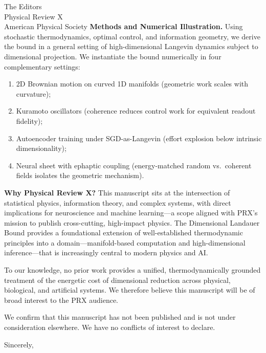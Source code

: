 \documentclass[11pt]{letter}
\begin{document}
\begin{letter}{The Editors\\Physical Review X\\American Physical Society}
\textbf{Methods and Numerical Illustration.} Using stochastic thermodynamics, optimal control, and information geometry, we derive the bound in a general setting of high-dimensional Langevin dynamics subject to dimensional projection. We instantiate the bound numerically in four complementary settings:
\begin{enumerate}
\item 2D Brownian motion on curved 1D manifolds (geometric work scales with curvature);
\item Kuramoto oscillators (coherence reduces control work for equivalent readout fidelity);
\item Autoencoder training under SGD-as-Langevin (effort explosion below intrinsic dimensionality);
\item Neural sheet with ephaptic coupling (energy-matched random vs.\ coherent fields isolates the geometric mechanism).
\end{enumerate}

\textbf{Why Physical Review X?} This manuscript sits at the intersection of statistical physics, information theory, and complex systems, with direct implications for neuroscience and machine learning---a scope aligned with PRX's mission to publish cross-cutting, high-impact physics. The Dimensional Landauer Bound provides a foundational extension of well-established thermodynamic principles into a domain---manifold-based computation and high-dimensional inference---that is increasingly central to modern physics and AI.

To our knowledge, no prior work provides a unified, thermodynamically grounded treatment of the energetic cost of dimensional reduction across physical, biological, and artificial systems. We therefore believe this manuscript will be of broad interest to the PRX audience.

We confirm that this manuscript has not been published and is not under consideration elsewhere. We have no conflicts of interest to declare.

\closing{Sincerely,}

\end{letter}
\end{document}
